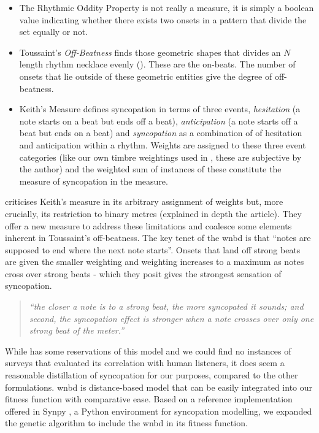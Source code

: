 {{{\begin{itemize}
  \item The Rhythmic Oddity Property \citep{arom2004african} is not really a measure, it is simply a boolean value indicating whether there exists two onsets in a pattern that divide the set equally or not.
  \item Toussaint's \textit{Off-Beatness} \citep{Toussaint2004African} finds those geometric shapes that divides an $N$ length rhythm necklace evenly (). These are the on-beats. The number of onsets that lie outside of these geometric entities give the degree of off-beatness.
  \item Keith's Measure \citep{keith1991polychords} defines syncopation in terms of three events, \textit{hesitation} (a note starts on a beat but ends off a beat), \textit{anticipation} (a note starts off a beat but ends on a beat) and \textit{syncopation} as a combination of of hesitation and anticipation within a rhythm. Weights are assigned to these three event categories (like our own timbre weightings used in , these are subjective by the author) and the weighted sum of instances of these constitute the measure of syncopation in the measure.
\end{itemize}}

\cite{Gomez2005} criticises Keith's measure in its arbitrary assignment of weights but, more crucially, its restriction to binary metres (explained in depth the article). They offer a new measure to address these limitations and coalesce some elements inherent in Toussaint's off-beatness. The key tenet of the \acrfull{wnbd} is that ``notes are supposed to end where the next note starts''. Onsets that land off strong beats are given the smaller weighting and weighting increases to a maximum as notes cross over strong beats - which they posit gives the strongest sensation of syncopation. 

\blockcquote[]{Gomez2007}{\textit{``the closer a note is to a strong beat, the more syncopated it sounds; and second, the syncopation effect is stronger when a note crosses over only one strong beat of the meter.''}}

While \cite{Song2013} has some reservations of this model and we could find no instances of surveys that evaluated its correlation with human listeners, it does seem a reasonable distillation of syncopation for our purposes, compared to the other formulations.  \acrshort{wnbd} is distance-based model that can be easily integrated into our fitness function with comparative ease.  Based on a reference implementation offered in Synpy \citep{Song2015}, a Python environment for syncopation modelling, we expanded the genetic algorithm to include the \acrshort{wnbd} in its fitness function.

}}
